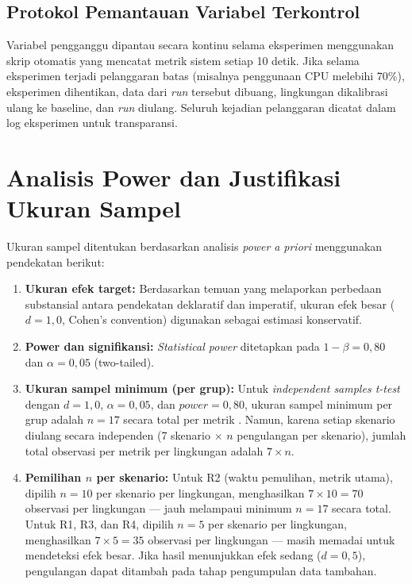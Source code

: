 \subsection{Protokol Pemantauan Variabel Terkontrol}

Variabel pengganggu dipantau secara kontinu selama eksperimen menggunakan skrip otomatis yang mencatat metrik sistem setiap 10 detik. Jika selama eksperimen terjadi pelanggaran batas (misalnya penggunaan CPU melebihi 70\%), eksperimen dihentikan, data dari \textit{run} tersebut dibuang, lingkungan dikalibrasi ulang ke baseline, dan \textit{run} diulang. Seluruh kejadian pelanggaran dicatat dalam log eksperimen untuk transparansi.

\section{Analisis Power dan Justifikasi Ukuran Sampel}

Ukuran sampel ditentukan berdasarkan analisis \textit{power} \textit{a priori} menggunakan pendekatan berikut:

\begin{enumerate}
    \item \textbf{Ukuran efek target:} Berdasarkan temuan \citet{kaggantinataraja2025security} yang melaporkan perbedaan substansial antara pendekatan deklaratif dan imperatif, ukuran efek besar ($d = 1{,}0$, Cohen's convention) digunakan sebagai estimasi konservatif.
    
    \item \textbf{Power dan signifikansi:} \textit{Statistical power} ditetapkan pada $1 - \beta = 0{,}80$ dan $\alpha = 0{,}05$ (two-tailed).
    
    \item \textbf{Ukuran sampel minimum (per grup):} Untuk \textit{independent samples t-test} dengan $d = 1{,}0$, $\alpha = 0{,}05$, dan $\mathit{power} = 0{,}80$, ukuran sampel minimum per grup adalah $n = 17$ secara total per metrik \citep{cohen1988statistical}. Namun, karena setiap skenario diulang secara independen (7 skenario $\times$ $n$ pengulangan per skenario), jumlah total observasi per metrik per lingkungan adalah $7 \times n$.
    
    \item \textbf{Pemilihan $n$ per skenario:} Untuk R2 (waktu pemulihan, metrik utama), dipilih $n = 10$ per skenario per lingkungan, menghasilkan $7 \times 10 = 70$ observasi per lingkungan --- jauh melampaui minimum $n = 17$ secara total. Untuk R1, R3, dan R4, dipilih $n = 5$ per skenario per lingkungan, menghasilkan $7 \times 5 = 35$ observasi per lingkungan --- masih memadai untuk mendeteksi efek besar. Jika hasil menunjukkan efek sedang ($d = 0{,}5$), pengulangan dapat ditambah pada tahap pengumpulan data tambahan.
\end{enumerate}

